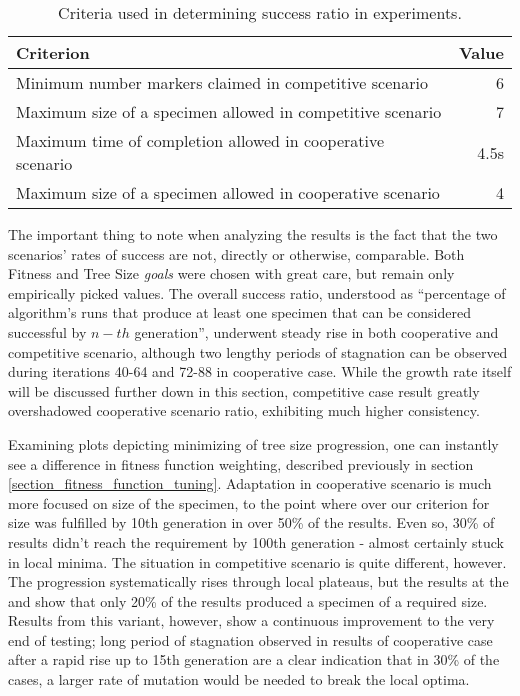 \begin{table} [H]
    \centering
    \begin{tabular} {l r}
        \hline \hline
        Criterion & Value \\
        \hline
        Minimum number markers claimed in competitive scenario & 6 \\
        Maximum size of a specimen allowed in competitive scenario & 7 \\
        Maximum time of completion allowed in cooperative scenario & 4.5s \\
        Maximum size of a specimen allowed in cooperative scenario & 4 \\
    \end{tabular}
    \caption{Criteria used in determining success ratio in experiments.}
    \label{table:x mass_test_success_criteria}
\end{table}

\newpage
The important thing to note when analyzing the results is the fact that the two scenarios' rates of success are not, directly or otherwise, comparable. Both Fitness and Tree Size \textit{goals} were chosen with great care, but remain only empirically picked values.
The overall success ratio, understood as ``percentage of algorithm's runs that produce at least one specimen that can be considered successful by $n-th$ generation'', underwent steady rise in both cooperative and competitive scenario, although two lengthy periods of stagnation can be observed during iterations 40-64 and 72-88 in cooperative case. While the growth rate itself will be discussed further down in this section, competitive case result greatly overshadowed cooperative scenario ratio, exhibiting much higher consistency.

Examining plots depicting minimizing of tree size progression, one can instantly see a difference in fitness function weighting, described previously in section \ref{section_fitness_function_tuning}. Adaptation in cooperative scenario is much more focused on size of the specimen, to the point where over our criterion for size was fulfilled by 10th generation in over 50\% of the results. Even so, 30\% of results didn't reach the requirement by 100th generation - almost certainly stuck in local minima. The situation in competitive scenario is quite different, however. The progression systematically rises through local plateaus, but the results at the and show that only 20\% of the results produced a specimen of a required size. Results from this variant, however, show a continuous improvement to the very end of testing; long period of stagnation observed in results of cooperative case after a rapid rise up to 15th generation are a clear indication that in 30\% of the cases, a larger rate of mutation would be needed to break the local optima.

